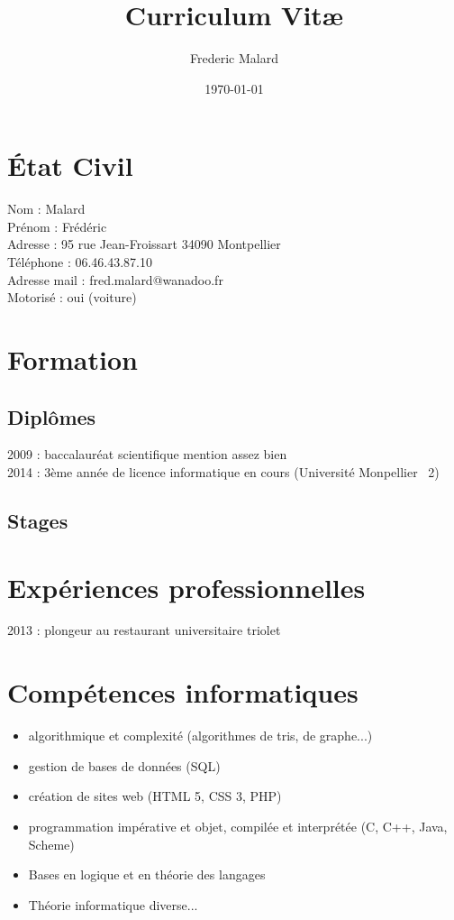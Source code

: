 \documentclass[a4paper]{article}
\title{Curriculum Vit\ae}
\author{Frederic Malard}
\date{\today}
\begin{document}
\maketitle

\section{\'Etat Civil}

Nom : Malard\\
Prénom : Frédéric\\
Adresse : 95 rue Jean-Froissart 34090 Montpellier\\
Téléphone : 06.46.43.87.10\\
Adresse mail : fred.malard@wanadoo.fr\\
Motorisé : oui (voiture)

\section{Formation}

\subsection{Diplômes}

2009 : baccalauréat scientifique mention assez bien\\
2014 : 3ème année de licence informatique en cours (Université Monpellier ~2)

\subsection{Stages}

\section{Expériences professionnelles}

2013 : plongeur au restaurant universitaire triolet

\section*{Compétences informatiques}

\begin{itemize}
\item algorithmique et complexité (algorithmes de tris, de graphe...)
\item gestion de bases de données (SQL)
\item création de sites web (HTML 5, CSS 3, PHP)
\item programmation impérative et objet, compilée et interprétée (C, C++, Java, Scheme)
\item Bases en logique et en théorie des langages
\item Théorie informatique diverse...
\end{itemize}
\end{document}
